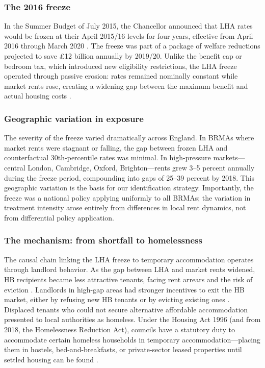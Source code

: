 \documentclass[12pt]{article}
\begin{document}
\subsubsection*{The 2016 freeze} In the Summer Budget of July 2015, the Chancellor announced that LHA rates would be frozen at their April 2015/16 levels for four years, effective from April 2016 through March 2020 \citep{hm2015}. The freeze was part of a package of welfare reductions projected to save \pounds 12 billion annually by 2019/20. Unlike the benefit cap or bedroom tax, which introduced new eligibility restrictions, the LHA freeze operated through passive erosion: rates remained nominally constant while market rents rose, creating a widening gap between the maximum benefit and actual housing costs \citep{palmer2017}.

\subsubsection*{Geographic variation in exposure} The severity of the freeze varied dramatically across England. In BRMAs where market rents were stagnant or falling, the gap between frozen LHA and counterfactual 30th-percentile rates was minimal. In high-pressure markets---central London, Cambridge, Oxford, Brighton---rents grew 3--5 percent annually during the freeze period, compounding into gaps of 25--39 percent by 2018. This geographic variation is the basis for our identification strategy. Importantly, the freeze was a national policy applying uniformly to all BRMAs; the variation in treatment intensity arose entirely from differences in local rent dynamics, not from differential policy application.

\subsubsection*{The mechanism: from shortfall to homelessness} The causal chain linking the LHA freeze to temporary accommodation operates through landlord behavior. As the gap between LHA and market rents widened, HB recipients became less attractive tenants, facing rent arrears and the risk of eviction \citep{rugg2019}. Landlords in high-gap areas had stronger incentives to exit the HB market, either by refusing new HB tenants or by evicting existing ones \citep{shelter2018}. Displaced tenants who could not secure alternative affordable accommodation presented to local authorities as homeless. Under the Housing Act 1996 (and from 2018, the Homelessness Reduction Act), councils have a statutory duty to accommodate certain homeless households in temporary accommodation---placing them in hostels, bed-and-breakfasts, or private-sector leased properties until settled housing can be found \citep{nao2017}.
\end{document}
